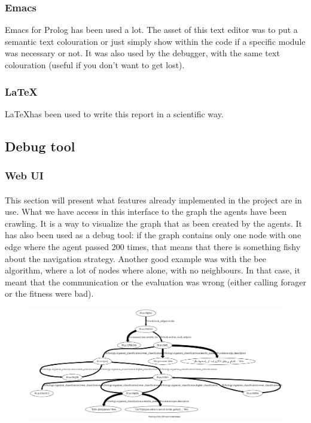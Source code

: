 \documentclass{article}
\begin{document}
		\subsubsection{Emacs}
			Emacs for Prolog has been used a lot.
			The asset of this text editor was to put a semantic text colouration
			or just simply show within the code if a specific module was necessary or not.
			It was also used by the debugger, with the same text colouration (useful if you don't want to get lost).
		\subsubsection{\LaTeX}
			\LaTeX \hspace{1mm}has been used to write this report in a scientific way.
	\subsection{Debug tool}
		\subsubsection{Web UI}
			\paragraph{}
				This section will present what features already implemented in the project are in use.
				What we have access in this interface to the graph the agents have been crawling.
				It is a way to visualize the graph that as been created by the agents.
				It has also been used as a debug tool: if the graph contains only one node with one edge where the agent passed 200 times,
				that means that there is something fishy about the navigation strategy.
				Another good example was with the bee algorithm, where a lot of nodes where alone, with no neighbours.
				In that case, it meant that the communication or the evaluation was wrong (either calling forager or the fitness were bad).
			\begin{figure}[!h]
				\hspace{-2cm}
				\includegraphics[width=1.4\textwidth]{../dh_graph}
			\end{figure}
\end{document}
